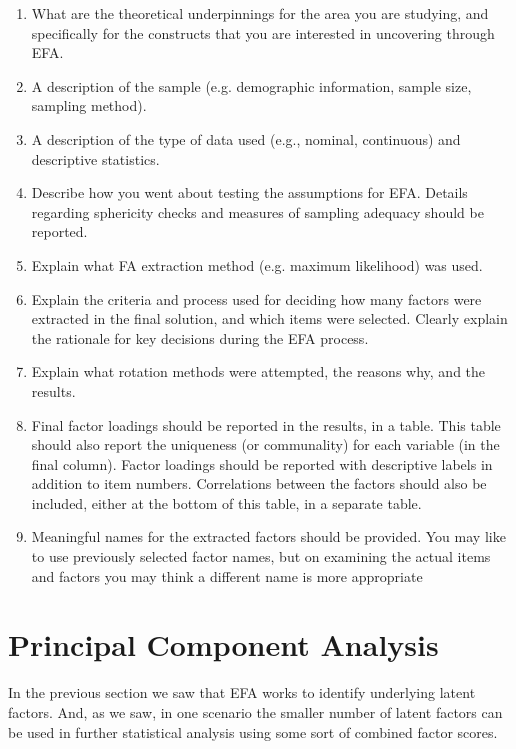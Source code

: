 \begin{enumerate} \itemsep -2pt
\item What are the theoretical underpinnings for the area you are studying, and specifically for the constructs that you are interested in uncovering through EFA. 
\item A description of the sample (e.g. demographic information, sample size, sampling method).
\item A description of the type of data used (e.g., nominal, continuous) and descriptive statistics.
\item Describe how you went about testing the assumptions for EFA. Details regarding sphericity checks and measures of sampling adequacy should be reported. 
\item Explain what FA extraction method (e.g. maximum likelihood) was used. 
\item Explain the criteria and process used for deciding how many factors were extracted in the final solution, and which items were selected. Clearly explain the rationale for key decisions during the EFA process.
\item Explain what rotation methods were attempted, the reasons why, and the results. 
\item Final factor loadings should be reported in the results, in a table. This table should also report the uniqueness (or communality) for each variable (in the final column). Factor loadings should be reported with descriptive labels in addition to item numbers. Correlations between the factors should also be included, either at the bottom of this table, in a separate table.
\item Meaningful names for the extracted factors should be provided. You may like to use previously selected factor names, but on examining the actual items and factors you may think a different name is more appropriate
\end{enumerate}


\section{Principal Component Analysis~\label{sec:PCA}}


In the previous section we saw that EFA works to identify underlying latent factors. And, as we saw, in one scenario the smaller number of latent factors can be used in further statistical analysis using some sort of combined factor scores.

